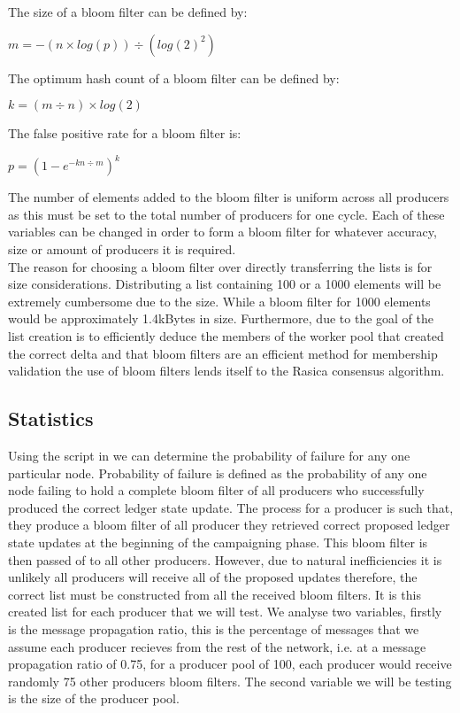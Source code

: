 The size of a bloom filter can be defined by: 

\begin{center} 
$m = -(n \times log(p)) \div (log(2)^2)$
\end{center} 

The optimum hash count of a bloom filter can be defined by:

\begin{center} 
$k = (m \div n) \times log(2)$
\end{center} 

The false positive rate for a bloom filter is: 

\begin{center} 
$p = (1 - e^{-kn \div m})^k$
\end{center} 

The number of elements added to the bloom filter is uniform across all producers as this must be set to the total number of producers for one cycle. Each of these variables can be changed in order to form a bloom filter for whatever accuracy, size or amount of producers it is required.\\

The reason for choosing a bloom filter over directly transferring the lists is for size considerations. Distributing a list containing 100 or a 1000 elements will be extremely cumbersome due to the size. While a bloom filter for 1000 elements would be approximately 1.4kBytes in size. Furthermore, due to the goal of the list creation is to efficiently deduce the members of the worker pool that created the correct delta and that bloom filters are an efficient method for membership validation the use of bloom filters lends itself to the Rasica consensus algorithm. 

\subsection{Statistics}

Using the script in \cite{python} we can determine the probability of failure for any one particular node. Probability of failure is defined as the probability of any one node failing to hold a complete bloom filter of all producers who successfully produced the correct ledger state update. The process for a producer is such that, they produce a bloom filter of all producer they retrieved correct proposed ledger state updates at the beginning of the campaigning phase. This bloom filter is then passed of to  all other producers. However, due to natural inefficiencies it is unlikely all producers will receive all of the proposed updates therefore, the correct list must be constructed from all the received bloom filters. It is this created list for each producer that we will test. We analyse two variables, firstly is the message propagation ratio, this is the percentage of messages that we assume each producer recieves from the rest of the network, i.e. at a message propagation ratio of 0.75, for a producer pool of 100, each producer would receive randomly 75 other producers bloom filters. The second variable we will be testing is the size of the producer pool. 